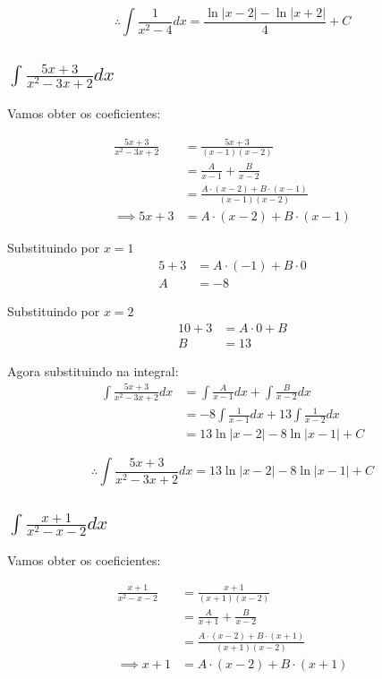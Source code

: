 \documentclass[12pt]{article}
\theoremstyle{definition}
\begin{document}
\[
    \boxed{
        \therefore \int{\frac{1}{x^2-4}dx} = \frac{\ln{|x-2|}-\ln{|x+2|}}{4} + C
    }
\]

\subsection{\(\int{\frac{5x+3}{x^2-3x+2}dx}\)}
Vamos obter os coeficientes:

\begin{align*}
    \frac{5x+3}{x^2-3x+2}
    &= \frac{5x+3}{(x-1)(x-2)} \\
    &= \frac{A}{x-1} + \frac{B}{x-2} \\
    &= \frac{A\cdot(x-2)+B\cdot(x-1)}{(x-1)(x-2)} \\
    \implies 5x+3
    &= A\cdot(x-2) + B\cdot(x-1)
\end{align*}

Substituindo por \(x = 1\)
\begin{align*}
    5+3 &= A\cdot(-1) + B \cdot 0 \\
    A &= -8
\end{align*}

Substituindo por \(x = 2\)
\begin{align*}
    10+3 &= A \cdot 0 + B \\
    B &= 13
\end{align*}

Agora substituindo na integral:
\begin{align*}
    \int{\frac{5x+3}{x^2-3x+2}dx}
    &= \int{\frac{A}{x-1}dx} + \int{\frac{B}{x-2}dx} \\
    &= -8\int{\frac{1}{x-1}dx} + 13\int{\frac{1}{x-2}dx}\\
    &= 13\ln{|x-2|} - 8\ln{|x-1|} + C
\end{align*}

\[
    \boxed{
        \therefore \int{\frac{5x+3}{x^2-3x+2}dx} = 13\ln{|x-2|} - 8\ln{|x-1|} + C
    }
\]

\subsection{\(\int{\frac{x+1}{x^2-x-2}dx}\)}
Vamos obter os coeficientes:

\begin{align*}
    \frac{x+1}{x^2-x-2}
    &= \frac{x+1}{(x+1)(x-2)} \\
    &= \frac{A}{x+1} + \frac{B}{x-2} \\
    &= \frac{A\cdot (x-2) + B\cdot (x+1)}{(x+1)(x-2)} \\
    \implies x+1
    &= A\cdot (x-2) + B\cdot (x+1)
\end{align*}
\end{document}
